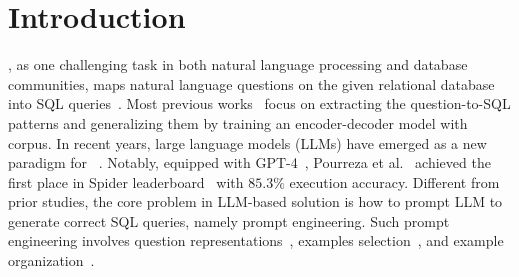 \section{Introduction}
\label{sec:intro}

\nlsql, as one challenging task in both natural language processing and database communities, maps natural language questions on the given relational database into SQL queries~\cite{nl2sql1, nl2sql2}. 
Most previous works~\cite{rat-sql, li2023graphix, li2023resdsql, DBLP:conf/acl/HuiGWQLLSL22, DBLP:conf/acl/ZhengWDWL22} focus on extracting the question-to-SQL patterns and generalizing them by training an encoder-decoder model with \nlsql corpus. 
In recent years, large language models (LLMs) have emerged as a new paradigm for \nlsql~\cite{DBLP:journals/corr/abs-2303-13547, rajkumar2022evaluating, trummer2022codexdb}. 
Notably, equipped with GPT-4~\cite{gpt4}, Pourreza et al.~\cite{din-sql} achieved the first place in Spider leaderboard~\cite{leaderboard} with $85.3\%$ execution accuracy.
Different from prior studies, the core problem in LLM-based \nlsql solution is how to prompt LLM to generate correct SQL queries, namely prompt engineering. 
Such prompt engineering involves question representations~\cite{openaiprompt,dong2023c3,DBLP:journals/corr/abs-2305-11853,din-sql}, examples selection~\cite{DBLP:conf/acl-deelio/LiuSZDCC22, DBLP:journals/corr/abs-2304-13301, enhancing}, and example organization~\cite{DBLP:journals/corr/abs-2304-13301}.

